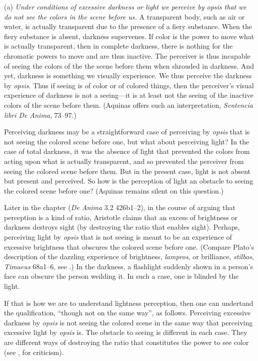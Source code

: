 (a) \emph{Under conditions of excessive darkness or light we perceive by \emph{opsis} that we do not see the colors in the scene before us.} A transparent body, such as air or water, is actually transparent due to the presence of a fiery substance. When the fiery substance is absent, darkness supervenes. If color is the power to move what is actually transparent, then in complete darkness, there is nothing for the chromatic powers to move and are thus inactive. The perceiver is thus incapable of seeing the colors of the the scene before them when shrouded in darkness. And yet, darkness is something we visually experience. We thus perceive the darkness by \emph{opsis}. Thus if seeing is of color or of colored things, then the perceiver's visual experience of darkness is not a seeing—it is at least not the seeing of the inactive colors of the scene before them. (Aquinas offers such an interpretation, \emph{Sentencia libri De Anima}, 73–97.)

Perceiving darkness may be a straightforward case of perceiving by \emph{opsis} that is not seeing the colored scene before one, but what about perceiving light? In the case of total darkness, it was the absence of light that prevented the colors from acting upon what is actually transparent, and so prevented the perceiver from seeing the colored scene before them. But in the present case, light is not absent but present and perceived. So how is the perception of light an obstacle to seeing the colored scene before one? (Aquinas remains silent on this question.)


Later in the chapter (\emph{De Anima} 3.2 426b1–2), in the course of arguing that perception is a kind of ratio, Aristotle claims that an excess of brightness or darkness destroys sight (by destroying the ratio that enables sight). Perhaps, perceiving light by \emph{opsis} that is not seeing is meant to be an experience of excessive brightness that obscures the colored scene before one. (Compare Plato's description of the dazzling experience of brightness, \emph{lampros}, or brilliance, \emph{stilbos}, \emph{Timaeus} 68a1–6, see \citealt[72–7]{Kalderon:2022kl}.) In the darkness, a flashlight suddenly shown in a person's face can obscure the person weilding it. In such a case, one is blinded by the light.

If that is how we are to understand lightness perception, then one can undertand the qualification, ``though not on the same way'', as follows. Perceiving excessive darkness by \emph{opsis} is not seeing the colored scene in the same way that perceiving excessive light by \emph{opsis} is. The obstacle to seeing is different in each case. They are different ways of destroying the ratio that constitutes the power to see color (see \citealt[275]{Ross:1961uq}, for criticism).

